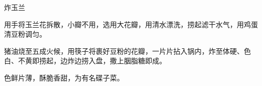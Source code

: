 \begin{recipe}{炸玉兰}

\ingredients


\preparation

\step 用手将玉兰花拆散，小瓣不用，选用大花瓣，用清水漂洗，捞起滤干水气，用鸡蛋
清豆粉调匀。

\step 猪油烧至五成火候，用筷子将裹好豆粉的花瓣，一片片拈入锅内，炸至体硬、色
白、不黄即捞起，边炸边捞入盘，撒上胭脂糖即成。

\features

色鲜片薄，酥脆香甜，为有名碟子菜。

\end{recipe}

